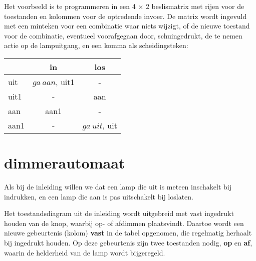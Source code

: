 \documentclass[a4paper, 11pt, fleqn, twoside]{scrartcl}%
\begin{document}
\begin{center}
\end{center}

Het voorbeeld is te programmeren in een 4 $\times$ 2 beslismatrix
 met rijen voor de toestanden en kolommen voor de optredende invoer.
De matrix wordt ingevuld met een minteken voor een combinatie waar
 niets wijzigt, of de nieuwe toestand voor de combinatie, eventueel
 voorafgegaan door, schuingedrukt, de te nemen actie op de lampuitgang,
 en een komma als scheidingsteken:\\
 
\begin{center}
\begin{tabular}{|l|c|c|}\hline
     & in & los\\ \hline
 uit & $ga\ aan$, uit1	& -\\ \hline
uit1 & - & aan\\ \hline
 aan & aan1 & -\\ \hline
aan1 & - & $ga\ uit$, uit\\ \hline
\end{tabular}
\end{center}

\section{dimmerautomaat}

Als bij de inleiding willen we dat een lamp die uit is meteen inschakelt
 bij indrukken, en een lamp die aan is pas uitschakelt bij loslaten.

Het toestandsdiagram uit de inleiding wordt uitgebreid met vast ingedrukt
 houden van de knop, waarbij op- of afdimmen plaatsvindt. Daartoe wordt
 een nieuwe gebeurtenis (kolom) \textbf{vast} in de tabel opgenomen, die 
 regelmatig herhaalt bij ingedrukt houden. Op deze gebeurtenis zijn twee
 toestanden nodig, \textbf{op} en \textbf{af}, waarin de helderheid van
 de lamp wordt bijgeregeld.
\end{document}
